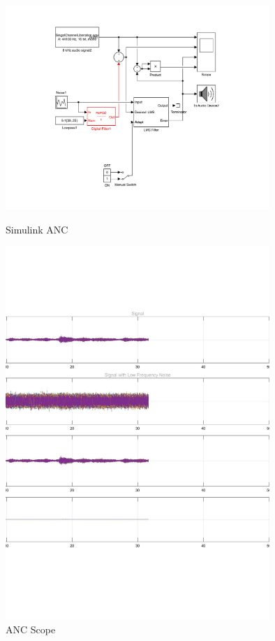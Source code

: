 \documentclass[conference,compsoc]{IEEEtran}
\begin{document}
\begin{figure} 
	\begin{center}     
     \includegraphics[width=10cm]{ANC_try1.pdf}
	\caption{Simulink ANC} \label{fig1}
	\end{center}
	\begin{center}     
     \includegraphics[width=10cm]{scope.pdf}
	\caption{ANC Scope} \label{fig2}
	\end{center}
\end{figure}
\end{document}
